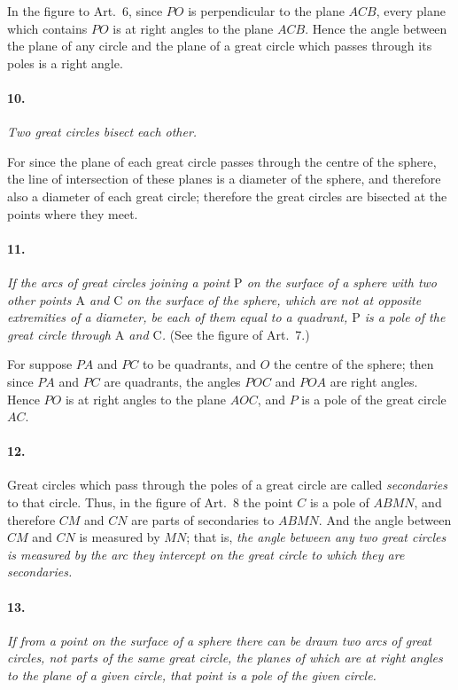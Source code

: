 \documentclass{book}[2004/02/16]
\begin{document}
\begin{mainmatter}
\begin{spacing}{1.3}
In the figure to Art.~6, since $PO$ is perpendicular to the plane
$ACB$, every plane which contains $PO$ is at right angles to the
plane $ACB$. Hence the angle between the plane of any circle
and the plane of a great circle which passes through its poles is
a right angle.

\paragraph{10.} \textit{Two great circles bisect each other.}

For since the plane of each great circle passes through the
centre of the sphere, the line of intersection of these planes is a
diameter of the sphere, and therefore also a diameter of each great
circle; therefore the great circles are bisected at the points where
they meet.

\paragraph{11.} \textit{If the arcs of great circles joining a point $\mathrm{P}$ on the surface
of a sphere with two other points $\mathrm{A}$ and $\mathrm{C}$ on the surface of the
sphere, which are not at opposite extremities of a diameter, be each of
them equal to a quadrant, $\mathrm{P}$ is a pole of the great circle through
$\mathrm{A}$ and $\mathrm{C}$.} (See the figure of Art.~7.)

For suppose $PA$ and $PC$ to be quadrants, and $O$ the centre of
the sphere; then since $PA$ and $PC$ are quadrants, the angles $POC$
and $POA$ are right angles. Hence $PO$ is at right angles to the
plane $AOC$, and $P$ is a pole of the great circle $AC$.

\paragraph{12.} Great circles which pass through the poles of a great
circle are called \textit{secondaries} to that circle. Thus, in the figure of
Art.~8 the point $C$ is a pole of $ABMN$, and therefore $CM$ and $CN$
are parts of secondaries to $ABMN$. And the angle between $CM$
and $CN$ is measured by $MN$; that is, \textit{the angle between any two
great circles is measured by the arc they intercept on the great circle
to which they are secondaries.}

\paragraph{13.} \textit{If from a point on the surface of a sphere there can be
drawn two arcs of great circles, not parts of the same great circle,
the planes of which are at right angles to the plane of a given circle,
that point is a pole of the given circle.}


\end{spacing}
\end{mainmatter}
\end{document}

